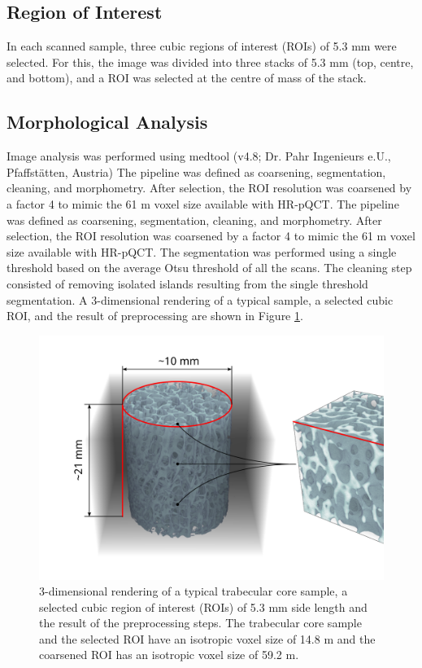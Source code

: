 \documentclass[a4paper,fleqn]{DC_ArtStyle}
\begin{document}
	\subsection{Region of Interest}
	In each scanned sample, three cubic regions of interest (ROIs) of 5.3 mm were selected.
	For this, the image was divided into three stacks of 5.3 mm (top, centre, and bottom), and a ROI was selected at the centre of mass of the stack.

	\subsection{Morphological Analysis}
	Image analysis was performed using medtool (v4.8; Dr. Pahr Ingenieurs e.U., Pfaffstätten, Austria)
	The pipeline was defined as coarsening, segmentation, cleaning, and morphometry.
	After selection, the ROI resolution was coarsened by a factor 4 to mimic the 61 \textmu m voxel size available with HR-pQCT.
	The pipeline was defined as coarsening, segmentation, cleaning, and morphometry.
	After selection, the ROI resolution was coarsened by a factor 4 to mimic the 61 \textmu m voxel size available with HR-pQCT.
	The segmentation was performed using a single threshold based on the average Otsu threshold \cite{Otsu1979} of all the scans.
	The cleaning step consisted of removing isolated islands resulting from the single threshold segmentation.
	A 3-dimensional rendering of a typical sample, a selected cubic ROI, and the result of preprocessing are shown in Figure \ref{FigSample}.

	\begin{figure}
		\includegraphics[width=\linewidth]{SampleNew}
		\caption{3-dimensional rendering of a typical trabecular core sample, a selected cubic region of interest (ROIs) of 5.3 mm side length and the result of the preprocessing steps.
			     The trabecular core sample and the selected ROI have an isotropic voxel size of 14.8 \textmu m and the coarsened ROI has an isotropic voxel size of 59.2 \textmu m.}
		\label{FigSample}
	\end{figure}
\end{document}
